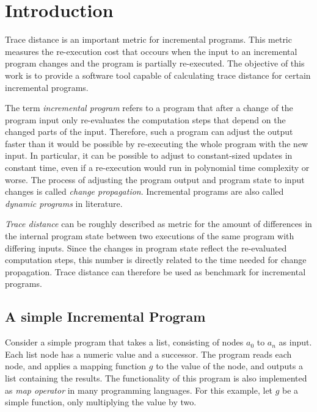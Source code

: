 
\chapter{Introduction}
\label{ch:Introduction}

Trace distance is an important metric for incremental programs. This metric measures the re-execution cost that occours when the input to an incremental program changes and the program is partially re-executed. The objective of this work is to provide a software tool capable of calculating trace distance for certain incremental programs.  

The term \textit{incremental program} refers to a program that after a change of the program input only re-evaluates the computation steps that depend on the changed parts of the input. Therefore, such a program can adjust the output faster than it would be possible by re-executing the whole program with the new input. In particular, it can be possible to adjust to constant-sized updates in constant time, even if a re-execution would run in polynomial time complexity or worse. The process of adjusting the program output and program state to input changes is called \textit{change propagation}. Incremental programs are also called \textit{dynamic programs} in literature. 

\textit{Trace distance} can be roughly described as metric for the amount of differences in the internal program state between two executions of the same program with differing inputs. Since the changes in program state reflect the re-evaluated computation steps, this number is directly related to the time needed for change propagation. Trace distance can therefore be used as benchmark for incremental programs. 

\section{A simple Incremental Program}
\label{sec:simple_example}
Consider a simple program that takes a list, consisting of nodes $a_0$ to $a_n$ as input. Each list node has a numeric value and a successor. The program reads each node, and applies a mapping function $g$ to the value of the node, and outputs a list containing the results. The functionality of this program is also implemented as \textit{map operator} in many programming languages. For this example, let $g$ be a simple function, only multiplying the value by two. 

